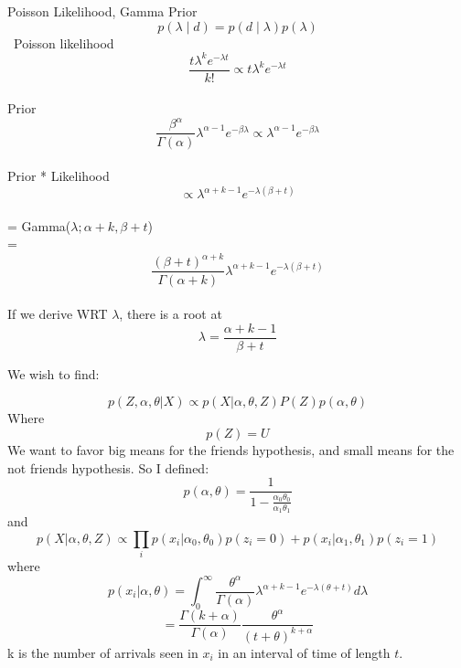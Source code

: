 \documentclass[12pt,fleqn,leqno,letterpaper]{article}
\begin{document}
Poisson Likelihood, Gamma Prior \\
$$p(\lambda \mid d) = p(d \mid \lambda) p(\lambda) $$\
Poisson likelihood\\
 $$ \frac{t\lambda^{k} e^{-\lambda t}}{k!} \propto t\lambda^{k} e^{-\lambda t} $$\\
Prior\\
$$ \frac{\beta^{\alpha}}{\Gamma(\alpha)}\lambda^{\alpha - 1} e^{-\beta\lambda} \propto \lambda^{\alpha -1} e^{-\beta \lambda} $$\\
Prior * Likelihood\\
$$ \propto \lambda^{\alpha + k - 1} e^{-\lambda(\beta+t)} $$\\
= Gamma($\lambda;\alpha+k,\beta+t$)\\
= 
$$\frac{(\beta+t)^{\alpha+k}}{\Gamma(\alpha+k)} \lambda^{\alpha+k-1} e^{-\lambda(\beta + t)}$$\\
If we derive WRT $\lambda$, there is a root at
$$ \lambda = \frac{\alpha + k -1}{\beta + t} $$



We wish to find:

$$
p(Z, \alpha, \theta | X) \propto p(X | \alpha, \theta, Z) P(Z) p( \alpha, \theta) $$
Where
 $$
p(Z) = U
$$
We want to favor big means for the friends hypothesis, and small means for the not friends hypothesis. So I defined:
 $$
p( \alpha, \theta) = \frac{1}{1 - \frac{\alpha_0 \theta_0}{\alpha_1 \theta_1}}
$$
and
$$
p(X | \alpha, \theta, Z) \propto \prod_i p(x_i | \alpha_0, \theta_0)p(z_i = 0) + p(x_i | \alpha_1, \theta_1) p(z_i = 1)
$$
where
$$
p(x_i | \alpha, \theta) = \int_0^\infty \frac{\theta^\alpha}{\Gamma(\alpha)} \lambda^{\alpha+k-1} e^{-\lambda(\theta+t)} d\lambda
$$
$$
= \frac{\Gamma(k+\alpha)}{\Gamma(\alpha)} \frac{\theta^\alpha}{(t+\theta)^{k+\alpha}} 
$$
k is the number of arrivals seen in $x_i$ in an interval of time of length $t$.





\end{document}
